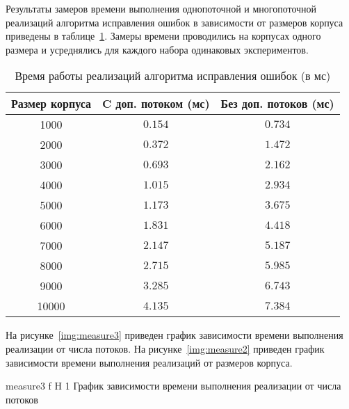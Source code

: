 \clearpage

Результаты замеров времени выполнения однопоточной и многопоточной реализаций алгоритма исправления ошибок в зависимости от размеров корпуса приведены в таблице~\ref{tbl:time_measurements2}. Замеры времени проводились на корпусах одного размера и усреднялись для каждого набора одинаковых экспериментов.


\begin{table}[H]
	\begin{center}
		\begin{threeparttable}
			\captionsetup{justification=raggedright,singlelinecheck=off}
			\caption{Время работы реализаций алгоритма исправления ошибок (в мс)}
			\label{tbl:time_measurements2}
			\begin{tabular}{|c|c|c|}
				\hline
				Размер корпуса &  C доп. потоком (мс) & Без доп. потоков (мс)\\
				\hline
			1000 &$ 0.154 $&$ 0.734$\\
			\hline
			2000 &$ 0.372 $&$ 1.472$\\
			\hline
			3000 &$ 0.693 $&$ 2.162$\\
			\hline
			4000 &$ 1.015 $&$ 2.934$\\
			\hline
			5000 &$ 1.173 $&$ 3.675$\\
			\hline
			6000 &$ 1.831 $&$ 4.418$\\
			\hline
			7000 &$ 2.147 $&$ 5.187$\\
			\hline
			8000 &$ 2.715 $&$ 5.985$\\
			\hline
			9000 &$ 3.285 $&$ 6.743$\\
			\hline
			10000 &$ 4.135 $&$ 7.384$\\
			\hline
				
			\end{tabular}
		\end{threeparttable}
	\end{center}
\end{table}

На рисунке~\ref{img:measure3} приведен график зависимости времени выполнения реализации от числа потоков. На рисунке~\ref{img:measure2} приведен график зависимости времени выполнения реализаций от размеров корпуса.  

{measure3} %
{f} %
{H} %
{1\textwidth} %
{График зависимости времени выполнения реализации от числа потоков} %


